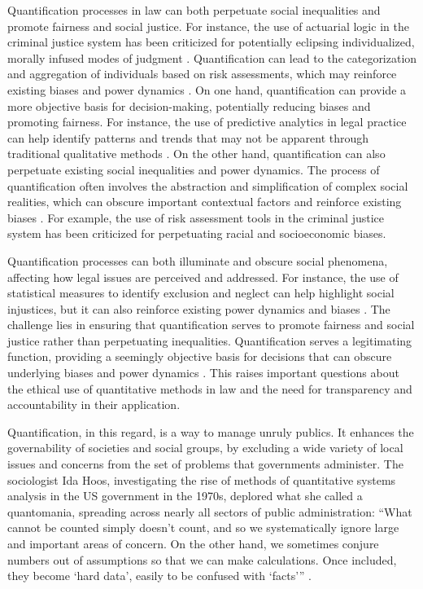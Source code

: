 Quantification processes in law can both perpetuate social inequalities and promote fairness and social justice. For instance, the use of actuarial logic in the criminal justice system has been criticized for potentially eclipsing individualized, morally infused modes of judgment \cite{101111lsi12334}. Quantification can lead to the categorization and aggregation of individuals based on risk assessments, which may reinforce existing biases and power dynamics \cite{101111lsi12334}. On one hand, quantification can provide a more objective basis for decision-making, potentially reducing biases and promoting fairness. For instance, the use of predictive analytics in legal practice can help identify patterns and trends that may not be apparent through traditional qualitative methods \cite{silva2023role}. On the other hand, quantification can also perpetuate existing social inequalities and power dynamics. The process of quantification often involves the abstraction and simplification of complex social realities, which can obscure important contextual factors and reinforce existing biases \cite{10_1057_s41599_020_0396_5}. For example, the use of risk assessment tools in the criminal justice system has been criticized for perpetuating racial and socioeconomic biases.

Quantification processes can both illuminate and obscure social phenomena, affecting how legal issues are perceived and addressed. For instance, the use of statistical measures to identify exclusion and neglect can help highlight social injustices, but it can also reinforce existing power dynamics and biases \cite{10_1057_s41599_020_0396_5}. The challenge lies in ensuring that quantification serves to promote fairness and social justice rather than perpetuating inequalities. Quantification serves a legitimating function, providing a seemingly objective basis for decisions that can obscure underlying biases and power dynamics \cite{10_1057_s41599_020_0396_5}. This raises important questions about the ethical use of quantitative methods in law and the need for transparency and accountability in their application.

Quantification, in this regard, is a way to manage unruly publics. It enhances the governability of societies and social groups, by excluding a wide variety of local issues and concerns from the set of problems that governments administer. The sociologist Ida Hoos, investigating the rise of methods of quantitative systems analysis in the US government in the 1970s, deplored what she called a quantomania, spreading across nearly all sectors of public administration: “What cannot be counted simply doesn’t count, and so we systematically ignore large and important areas of concern. On the other hand, we sometimes conjure numbers out of assumptions so that we can make calculations. Once included, they become ‘hard data’, easily to be confused with ‘facts’” \cite{ribeiro2021quantification}.

